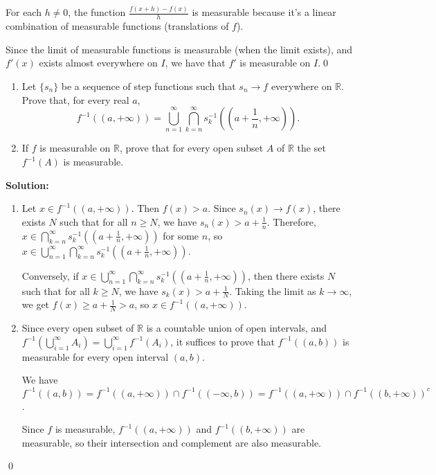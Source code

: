 For each $h \neq 0$, the function $\frac{f(x + h) - f(x)}{h}$ is measurable because it's a linear combination of measurable functions (translations of $f$).

Since the limit of measurable functions is measurable (when the limit exists), and $f'(x)$ exists almost everywhere on $I$, we have that $f'$ is measurable on $I$.\qed


\begin{problembox}
\begin{enumerate}[label=(\alph*)]
    \item Let $\{s_n\}$ be a sequence of step functions such that $s_n \to f$ everywhere on $\mathbb{R}$. Prove that, for every real $a$,
    \[f^{-1}((a, +\infty)) = \bigcup_{n=1}^\infty \bigcap_{k=n}^\infty s_k^{-1} \left( \left( a + \frac{1}{n}, +\infty \right) \right).\]
    \item If $f$ is measurable on $\mathbb{R}$, prove that for every open subset $A$ of $\mathbb{R}$ the set $f^{-1}(A)$ is measurable.
\end{enumerate}
\end{problembox}

\bigskip\noindent\textbf{Solution:}
\begin{enumerate}[label=(\alph*)]
    \item Let $x \in f^{-1}((a, +\infty))$. Then $f(x) > a$. Since $s_n(x) \to f(x)$, there exists $N$ such that for all $n \geq N$, we have $s_n(x) > a + \frac{1}{n}$. Therefore, $x \in \bigcap_{k=n}^\infty s_k^{-1}((a + \frac{1}{n}, +\infty))$ for some $n$, so $x \in \bigcup_{n=1}^\infty \bigcap_{k=n}^\infty s_k^{-1}((a + \frac{1}{n}, +\infty))$.
    
    Conversely, if $x \in \bigcup_{n=1}^\infty \bigcap_{k=n}^\infty s_k^{-1}((a + \frac{1}{n}, +\infty))$, then there exists $N$ such that for all $k \geq N$, we have $s_k(x) > a + \frac{1}{N}$. Taking the limit as $k \to \infty$, we get $f(x) \geq a + \frac{1}{N} > a$, so $x \in f^{-1}((a, +\infty))$.
    
    \item Since every open subset of $\mathbb{R}$ is a countable union of open intervals, and $f^{-1}(\bigcup_{i=1}^{\infty} A_i) = \bigcup_{i=1}^{\infty} f^{-1}(A_i)$, it suffices to prove that $f^{-1}((a, b))$ is measurable for every open interval $(a, b)$.
    
    We have $f^{-1}((a, b)) = f^{-1}((a, +\infty)) \cap f^{-1}((-\infty, b)) = f^{-1}((a, +\infty)) \cap f^{-1}((b, +\infty))^c$.
    
    Since $f$ is measurable, $f^{-1}((a, +\infty))$ and $f^{-1}((b, +\infty))$ are measurable, so their intersection and complement are also measurable.
\end{enumerate}\qed



